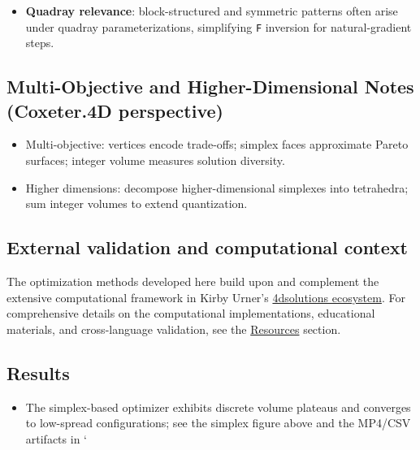 \documentclass[
  10pt,
]{article}
\newcommand{\passthrough}[1]{#1}
\providecommand{\tightlist}{%
  \setlength{\itemsep}{0pt}\setlength{\parskip}{0pt}}
\begin{document}
\begin{itemize}
\tightlist
\item
  \textbf{Quadray relevance}: block-structured and symmetric patterns
  often arise under quadray parameterizations, simplifying
  \passthrough{\lstinline!F!} inversion for natural-gradient steps.
\end{itemize}

\hypertarget{multi-objective-and-higher-dimensional-notes-coxeter.4d-perspective}{%
\subsection{Multi-Objective and Higher-Dimensional Notes (Coxeter.4D
perspective)}\label{multi-objective-and-higher-dimensional-notes-coxeter.4d-perspective}}

\begin{itemize}
\tightlist
\item
  Multi-objective: vertices encode trade-offs; simplex faces approximate
  Pareto surfaces; integer volume measures solution diversity.
\item
  Higher dimensions: decompose higher-dimensional simplexes into
  tetrahedra; sum integer volumes to extend quantization.
\end{itemize}

\hypertarget{external-validation-and-computational-context}{%
\subsection{External validation and computational
context}\label{external-validation-and-computational-context}}

The optimization methods developed here build upon and complement the
extensive computational framework in Kirby Urner's
\href{https://github.com/4dsolutions}{4dsolutions ecosystem}. For
comprehensive details on the computational implementations, educational
materials, and cross-language validation, see the
\href{07_resources.md}{Resources} section.

\hypertarget{results}{%
\subsection{Results}\label{results}}

\begin{itemize}
\tightlist
\item
  The simplex-based optimizer exhibits discrete volume plateaus and
  converges to low-spread configurations; see the simplex figure above
  and the MP4/CSV artifacts in `
\end{itemize}
\end{document}
